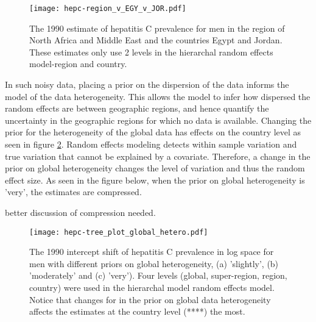     \begin{figure}[h]
        \begin{center}
            \texttt{[image: hepc-region\_v\_EGY\_v\_JOR.pdf]}
            \caption{The 1990 estimate of hepatitis C prevalence for men in the region of North Africa and Middle East and the countries Egypt and Jordan.  These estimates only use 2 levels in the hierarchal random effects model-region and country.}
            \label{fig:app-hepc regional rfx}
        \end{center}
    \end{figure}    

In such noisy data, placing a prior on the dispersion of the data informs the model of the data heterogeneity.  This allows the model to infer how dispersed the random effects are between geographic regions, and hence quantify the uncertainty in the geographic regions for which no data is available.  Changing the prior for the heterogeneity of the global data has effects on the country level as seen in figure \ref{fig:app-hepc global hetero}.  Random effects modeling detects within sample variation and true variation that cannot be explained by a covariate.  Therefore, a change in the prior on global heterogeneity changes the level of variation and thus the random effect size.  As seen in the figure below, when the prior on global heterogeneity is 'very', the estimates are compressed.

better discussion of compression needed.

    \begin{figure}[h]
        \begin{center}
            \texttt{[image: hepc-tree\_plot\_global\_hetero.pdf]}
            \caption{The 1990 intercept shift of hepatitis C prevalence  in log space for men with different priors on global heterogeneity, (a) 'slightly', (b) 'moderately' and (c) 'very').  Four levels (global, super-region, region, country) were used in the hierarchal model random effects model.  Notice that changes for in the prior on global data heterogeneity affects the estimates at the country level (****) the most.}
            \label{fig:app-hepc global hetero}
        \end{center}
    \end{figure}
